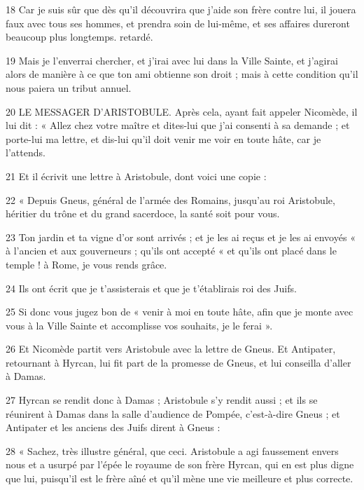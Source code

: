 \par 18 Car je suis sûr que dès qu'il découvrira que j'aide son frère contre lui, il jouera faux avec tous ses hommes, et prendra soin de lui-même, et ses affaires dureront beaucoup plus longtemps. retardé.

\par 19 Mais je l'enverrai chercher, et j'irai avec lui dans la Ville Sainte, et j'agirai alors de manière à ce que ton ami obtienne son droit ; mais à cette condition qu’il nous paiera un tribut annuel.

\par 20 LE MESSAGER D'ARISTOBULE. Après cela, ayant fait appeler Nicomède, il lui dit : « Allez chez votre maître et dites-lui que j'ai consenti à sa demande ; et porte-lui ma lettre, et dis-lui qu'il doit venir me voir en toute hâte, car je l'attends.

\par 21 Et il écrivit une lettre à Aristobule, dont voici une copie :

\par 22 « Depuis Gneus, général de l'armée des Romains, jusqu'au roi Aristobule, héritier du trône et du grand sacerdoce, la santé soit pour vous.

\par 23 Ton jardin et ta vigne d'or sont arrivés ; et je les ai reçus et je les ai envoyés « à l'ancien et aux gouverneurs ; qu'ils ont accepté « et qu'ils ont placé dans le temple ! à Rome, je vous rends grâce.

\par 24 Ils ont écrit que je t'assisterais et que je t'établirais roi des Juifs.

\par 25 Si donc vous jugez bon de « venir à moi en toute hâte, afin que je monte avec vous à la Ville Sainte et accomplisse vos souhaits, je le ferai ».

\par 26 Et Nicomède partit vers Aristobule avec la lettre de Gneus. Et Antipater, retournant à Hyrcan, lui fit part de la promesse de Gneus, et lui conseilla d'aller à Damas.

\par 27 Hyrcan se rendit donc à Damas ; Aristobule s'y rendit aussi ; et ils se réunirent à Damas dans la salle d'audience de Pompée, c'est-à-dire Gneus ; et Antipater et les anciens des Juifs dirent à Gneus :

\par 28 « Sachez, très illustre général, que ceci. Aristobule a agi faussement envers nous et a usurpé par l'épée le royaume de son frère Hyrcan, qui en est plus digne que lui, puisqu'il est le frère aîné et qu'il mène une vie meilleure et plus correcte.

